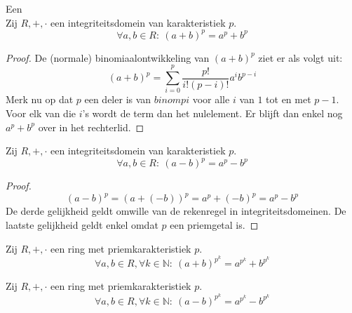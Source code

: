 \documentclass[main.tex]{subfiles}
\begin{document}
\begin{st}
  \label{st:rekenregel-in-integriteitsdomein}
  Een \\
  Zij $R,+,\cdot$ een integriteitsdomein van karakteristiek $p$.
  \[ \forall a,b \in R:\ (a+b)^{p} = a^{p}+b^{p} \]

  \begin{proof}
    De (normale) binomiaalontwikkeling van $(a+b)^{p}$ ziet er als volgt uit:
    \[ (a+b)^{p} = \sum_{i=0}^{p}\frac{p!}{i!(p-i)!} a^{i}b^{p-i} \]
    Merk nu op dat $p$ een deler is van $binom{p}{i}$ voor alle $i$ van $1$ tot en met $p-1$.
    Voor elk van die $i$'s wordt de term dan het nulelement.
    Er blijft dan enkel nog $a^{p} + b^{p}$ over in het rechterlid.
  \end{proof}
\end{st}

\begin{st}
  Zij $R,+,\cdot$ een integriteitsdomein van karakteristiek $p$.
  \[ \forall a,b \in R:\ (a-b)^{p} = a^{p}-b^{p} \]

  \begin{proof}
    \[ (a-b)^{p} = (a+(-b))^{p} = a^{p} + (-b)^{p} = a^{p} - b^{p} \]
    De derde gelijkheid geldt omwille van de rekenregel in integriteitsdomeinen.
    De laatste gelijkheid geldt enkel omdat $p$ een priemgetal is.
  \end{proof}
\end{st}

\begin{st}
  Zij $R,+,\cdot$ een ring met priemkarakteristiek $p$.
  \[ \forall a,b \in R, \forall k \in \mathbb{N}:\ (a+b)^{p^{k}} = a^{p^{k}}+b^{p^{k}} \]
\end{st}

\begin{st}
  Zij $R,+,\cdot$ een ring met priemkarakteristiek $p$.
  \[ \forall a,b \in R, \forall k \in \mathbb{N}:\ (a-b)^{p^{k}} = a^{p^{k}}-b^{p^{k}} \]
\end{st}
\end{document}
